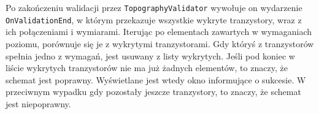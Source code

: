Po zakończeniu walidacji przez \texttt{TopographyValidator} wywołuje on wydarzenie \texttt{OnValidationEnd},
w którym przekazuje wszystkie wykryte tranzystory, wraz z ich połączeniami i wymiarami.
Iterując po elementach zawartych w wymaganiach poziomu,
porównuje się je z wykrytymi tranzystorami.
Gdy któryś z tranzystorów spełnia jedno z wymagań, jest usuwany z listy wykrytych.
Jeśli pod koniec w liście wykrytych tranzystorów nie ma już żadnych elementów,
to znaczy, że schemat jest poprawny.
Wyświetlane jest wtedy okno informujące o sukcesie.
W przeciwnym wypadku gdy pozostały jeszcze tranzystory, to znaczy, że schemat jest niepoprawny.
